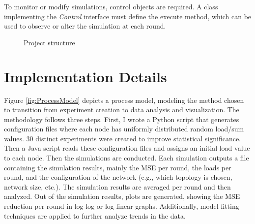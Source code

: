To monitor or modify simulations, control objects are required. A class implementing the \textit{Control} interface must define the execute method, which can be used to observe or alter the simulation at each round. \cite{peersimdocs}

\begin{figure}
    \centering
    \caption{Project structure}
    \label{fig:uml}
\end{figure}

\section{Implementation Details}\label{sec:implementationdetails}
Figure \ref{fig:ProcessModel} depicts a process model, modeling the method chosen to transition from experiment creation to data analysis and visualization. The methodology follows three steps. First, I wrote a Python script that generates configuration files where each node has uniformly distributed random load/sum values. 30 distinct experiments were created to improve statistical significance. Then a Java script reads these configuration files and assigns an initial load value to each node. Then the simulations are conducted. Each simulation outputs a file containing the simulation results, mainly the MSE per round, the loads per round, and the configuration of the network (e.g., which topology is chosen, network size, etc.). The simulation results are averaged per round and then analyzed. Out of the simulation results, plots are generated, showing the MSE reduction per round in log-log or log-linear graphs. Additionally, model-fitting techniques are applied to further analyze trends in the data.

